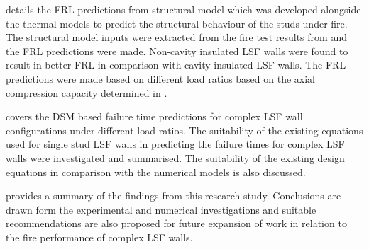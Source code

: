 \textbf{} details the FRL predictions from structural model which was developed alongside the thermal models to predict the structural behaviour of the studs under fire. The structural model inputs were extracted from the fire test results from  and the FRL predictions were made. Non-cavity insulated LSF walls were found to result in better FRL in comparison with cavity insulated LSF walls. The FRL predictions were made based on different load ratios based on the axial compression capacity determined in .

\textbf{} covers the DSM based failure time predictions for complex LSF wall configurations under different load ratios. The suitability of the existing equations used for single stud LSF walls in predicting the failure times for complex LSF walls were investigated and summarised. The suitability of the existing design equations in comparison with the numerical models is also discussed.

\textbf{} provides a summary of the findings from this research study. Conclusions are drawn form the experimental and numerical investigations and suitable recommendations are also proposed for future expansion of work in relation to the fire performance of complex LSF walls.

